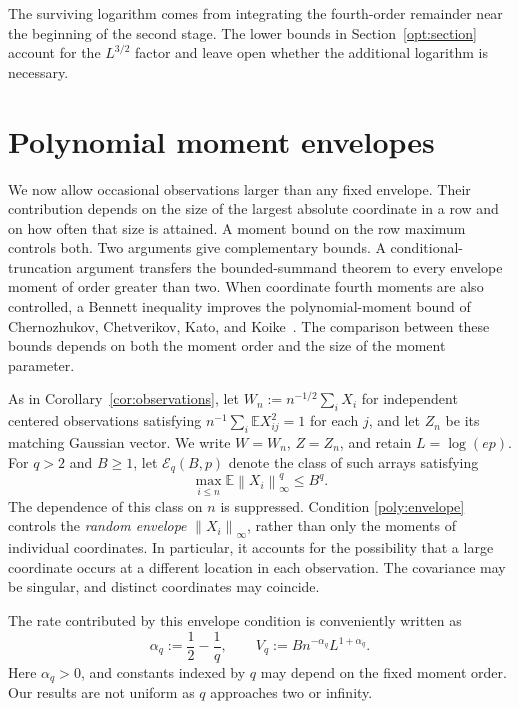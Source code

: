 \documentclass[11pt,letterpaper]{article}
\theoremstyle{remark}
\newcommand{\E}{\mathbb E}
\newcommand{\norm}[1]{\left\lVert#1\right\rVert}
\begin{document}
The surviving logarithm comes from integrating the fourth-order
remainder near the beginning of the second stage. The lower bounds in
Section~\ref{opt:section} account for the \(L^{3/2}\) factor and leave
open whether the additional logarithm is necessary.

\section{Polynomial moment envelopes}\label{sec:poly}

We now allow occasional observations larger than any fixed envelope.
Their contribution depends on the size of the largest absolute
coordinate in a row and on how often that size is attained. A moment
bound on the row maximum controls both. Two arguments give complementary bounds. A
conditional-truncation argument transfers the bounded-summand theorem
to every envelope moment of order greater than two. When coordinate
fourth moments are also controlled, a Bennett inequality improves the
polynomial-moment bound of Chernozhukov, Chetverikov, Kato, and
Koike~\cite{CCKK2022}. The comparison between these bounds depends on
both the moment order and the size of the moment parameter.

As in Corollary~\ref{cor:observations}, let \(W_n:=n^{-1/2}\sum_iX_i\)
for independent centered observations satisfying
\(n^{-1}\sum_i\E X_{ij}^2=1\) for each \(j\), and let \(Z_n\) be its matching Gaussian vector. We write
\(W=W_n\), \(Z=Z_n\), and retain \(L=\log(ep)\).
For \(q>2\) and \(B\ge1\), let \(\mathcal E_q(B,p)\) denote the class
of such arrays satisfying
\begin{equation}
 \max_{i\le n}\E\norm{X_i}_\infty^q\le B^q.
 \label{poly:envelope}
\end{equation}
The dependence of this class on \(n\) is suppressed. Condition
\eqref{poly:envelope} controls the \emph{random envelope}
\(\norm{X_i}_\infty\), rather than only the moments of individual
coordinates. In particular, it accounts for the possibility that a
large coordinate occurs at a different location in each observation.
The covariance may be singular, and distinct coordinates may coincide.

The rate contributed by this envelope condition is conveniently written
as
\begin{equation}
 \alpha_q:=\frac12-\frac1q,\qquad
 V_q:=Bn^{-\alpha_q}L^{1+\alpha_q}.
 \label{poly:rates}
\end{equation}
Here \(\alpha_q>0\), and constants indexed by \(q\) may depend on the
fixed moment order. Our results are not uniform as \(q\) approaches two
or infinity.
\end{document}
